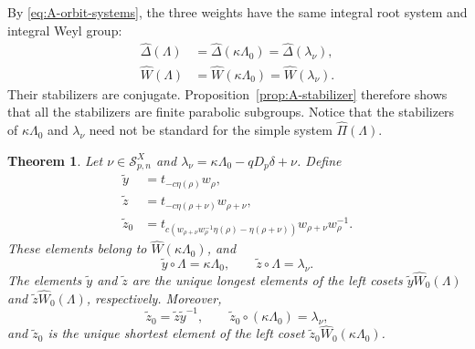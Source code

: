 \documentclass[11pt,a4paper]{amsart}
\theoremstyle{plain}
\newtheorem{theorem}{Theorem}[section]
\numberwithin{equation}{section}
\begin{document}
By \eqref{eq:A-orbit-systems}, the three weights have the same
integral root system and integral Weyl group:
\[
\begin{aligned}
\widehat\Delta(\Lambda)&=\widehat\Delta(\kappa\Lambda_0)
=\widehat\Delta(\lambda_\nu),\\
\widehat W(\Lambda)&=\widehat W(\kappa\Lambda_0)
=\widehat W(\lambda_\nu).
\end{aligned}
\]
Their stabilizers are conjugate. Proposition~\ref{prop:A-stabilizer}
therefore shows that all the stabilizers are finite parabolic subgroups. Notice that  the
stabilizers of \(\kappa\Lambda_0\) and \(\lambda_\nu\) need not be
standard for the simple system \(\widehat\Pi(\Lambda)\).

\begin{theorem}\label{thm:A-cosets}
Let \(\nu\in\mathcal S^X_{p,n}\) and
\(\lambda_\nu=\kappa\Lambda_0-qD_p\delta+\nu\). Define
\begin{equation}
\begin{aligned}
\widetilde y&=t_{-c\eta(\rho)}w_\rho,\\
\widetilde z&=t_{-c\eta(\rho+\nu)}w_{\rho+\nu},\\
\widetilde z_0
&=t_{c\left(w_{\rho+\nu}w_\rho^{-1}\eta(\rho)
-\eta(\rho+\nu)\right)}w_{\rho+\nu}w_\rho^{-1}.
\end{aligned}
\label{eq:A-coset-elements}
\end{equation}
These elements belong to \(\widehat W(\kappa\Lambda_0)\), and
\[
\widetilde y\circ\Lambda=\kappa\Lambda_0,\qquad
\widetilde z\circ\Lambda=\lambda_\nu.
\]
The elements \(\widetilde y\) and \(\widetilde z\) are the unique
longest elements of the left cosets
\(\widetilde y\widehat W_0(\Lambda)\) and
\(\widetilde z\widehat W_0(\Lambda)\), respectively. Moreover,
\[
\widetilde z_0=\widetilde z\widetilde y^{-1},\qquad
\widetilde z_0\circ(\kappa\Lambda_0)=\lambda_\nu,
\]
and \(\widetilde z_0\) is the unique shortest element of the left
coset \(\widetilde z_0\widehat W_0(\kappa\Lambda_0)\).
\end{theorem}
\end{document}
